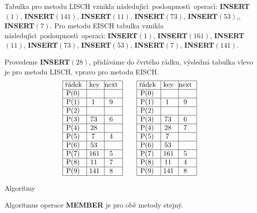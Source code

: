 \flushpar Tabulka pro metodu LISCH vznikla n\'asleduj\'\i c\'\i\ posloupnost\'\i\ 
operac\'\i :\newline 
{\bf INSERT$(1)$}, {\bf INSERT$(141)$}, {\bf INSERT$(11)$}, {\bf INSERT$
(73)$}, 
{\bf INSERT$(53)$},, {\bf INSERT$(7)$}.\newline 
Pro metodu EISCH tabulka vznikla n\'asleduj\'\i c\'\i\ posloupnost\'\i\ 
operac\'\i :\newline 
{\bf INSERT$(1)$}, {\bf INSERT$(161)$}, {\bf INSERT$(11)$}, {\bf INSERT$
(73)$}, 
{\bf INSERT$(53)$}, {\bf INSERT$(7)$}, {\bf INSERT$(141)$}. 

\flushpar Provedeme {\bf INSERT$(28)$}, p\v rid\'av\'ame do \v cvrt\'eho r\'adku, v\'y\-sled\-n\'a tabulka vlevo je pro meto\-du 
LISCH, vpravo pro metodu EISCH.
$$\vbox {\hbox{\vtop{\offinterlineskip\halign{\strut\vrule\ # & \vrule\ # & \vrule\hfil# \hfil\vrule\cr\noalign{\hrule}\v r\'adek & key & next \hfil\cr\noalign{\hrule}P(0) & &\hfill \cr\noalign{\hrule}P(1) & 1 & 9 \cr\noalign{\hrule}P(2) & &\hfill \cr\noalign{\hrule}P(3) & 73 & 6 \cr\noalign{\hrule}P(4) & 28 &\hfill \cr\noalign{\hrule}P(5) & 7 & 4 \cr\noalign{\hrule}P(6) & 53 &\hfill \cr\noalign{\hrule}P(7) & 161 & 5 \cr\noalign{\hrule}P(8) & 11 & 7 \cr\noalign{\hrule}P(9) & 141 & 8 \cr\noalign{\hrule}}}\qquad\vtop{\offinterlineskip\halign {\strut\vrule\ # & \vrule\ # & \vrule \hfil # \hfil \vrule\cr\noalign{\hrule}\v r\'adek & key & next \hfil \cr\noalign{\hrule}P(0) & &\hfill \cr\noalign{\hrule}P(1) & 1 & 9 \cr\noalign{\hrule}P(2) & &\hfill \cr\noalign{\hrule}P(3) & 73 & 6 \cr\noalign{\hrule}P(4) & 28 & 7 \cr\noalign{\hrule}P(5) & 7 & \hfill \cr\noalign{\hrule}P(6) & 53 & \hfill \cr\noalign{\hrule}P(7) & 161 & 5 \cr\noalign{\hrule}P(8) & 11 & 4  \cr\noalign{\hrule}P(9) & 141 & 8 \cr\noalign{\hrule}}}}}$$
\medskip

\subhead
Algoritmy
\endsubhead
\smallskip

\flushpar Algoritmus operace {\bf MEMBER} je pro ob\v e metody stejn\'y.
\smallskip

